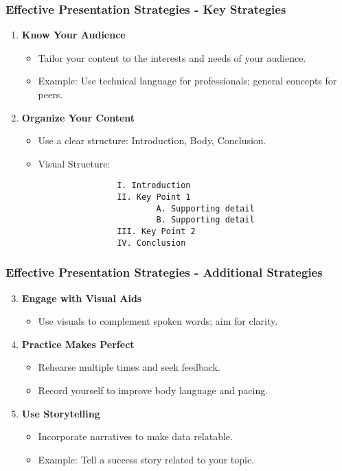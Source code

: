 \documentclass[aspectratio=169]{beamer}
\begin{document}
\begin{frame}[fragile]
    \frametitle{Effective Presentation Strategies - Key Strategies}
    \begin{enumerate}
        \item \textbf{Know Your Audience}
            \begin{itemize}
                \item Tailor your content to the interests and needs of your audience.
                \item Example: Use technical language for professionals; general concepts for peers.
            \end{itemize}
        
        \item \textbf{Organize Your Content}
            \begin{itemize}
                \item Use a clear structure: Introduction, Body, Conclusion.
                \item Visual Structure:
                \begin{lstlisting}
                I. Introduction
                II. Key Point 1
                        A. Supporting detail
                        B. Supporting detail
                III. Key Point 2
                IV. Conclusion
                \end{lstlisting}
            \end{itemize}
    \end{enumerate}
\end{frame}

\begin{frame}[fragile]
    \frametitle{Effective Presentation Strategies - Additional Strategies}
    \begin{enumerate}
        \setcounter{enumi}{2}
        \item \textbf{Engage with Visual Aids}
            \begin{itemize}
                \item Use visuals to complement spoken words; aim for clarity.
            \end{itemize}
        
        \item \textbf{Practice Makes Perfect}
            \begin{itemize}
                \item Rehearse multiple times and seek feedback.
                \item Record yourself to improve body language and pacing.
            \end{itemize}

        \item \textbf{Use Storytelling}
            \begin{itemize}
                \item Incorporate narratives to make data relatable.
                \item Example: Tell a success story related to your topic.
            \end{itemize}
    \end{enumerate}
\end{frame}
\end{document}
